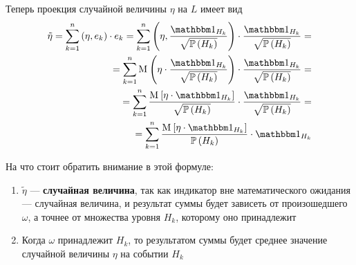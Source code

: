 Теперь проекция случайной величины $\eta$ на $L$ имеет вид
\begin{equation}\label{discreteConditionalExpectation}
  \begin{split}
  \tilde{\eta}
  = \sum_{k=1}^n \left( \eta, e_k \right) \cdot e_k
  = \sum_{k=1}^n
      \left( \eta, \frac{\indicatorof{H_k}}{\sqrt{\probability{H_k}}} \right) 
      \cdot \frac{\indicatorof{H_k}}{\sqrt{\probability{H_k}}} = \\
  = \sum_{k=1}^n
      \mean{\left( \eta
      \cdot \frac{\indicatorof{H_k}}{\sqrt{\probability{H_k}}} \right)}
      \cdot \frac{\indicatorof{H_k}}{\sqrt{\probability{H_k}}} = \\
  = \sum_{k=1}^n
      \frac{\Mean{ \eta \cdot \indicatorof{H_k} }}
      {\sqrt{\probability{H_k}}}
      \cdot \frac{\indicatorof{H_k}}{\sqrt{\probability{H_k}}} = \\
  = \sum_{k=1}^n
      \frac{\Mean{\eta \cdot \indicatorof{H_k}}}{\probability{H_k}}
      \cdot \indicatorof{H_k}
  \end{split}
\end{equation}

На что стоит обратить внимание в этой формуле:
\begin{enumerate}
  \item $\tilde{\eta}$ --- \textbf{случайная величина},
      так как индикатор вне математического ожидания --- случайная величина,
      и результат суммы будет зависеть от произошедшего $\omega$,
      а точнее от множества уровня $H_k$, которому оно принадлежит
  \item Когда $\omega$ принадлежит $H_k$,
      то результатом суммы будет среднее значение случайной величины $\eta$
      на событии $H_k$
\end{enumerate}

